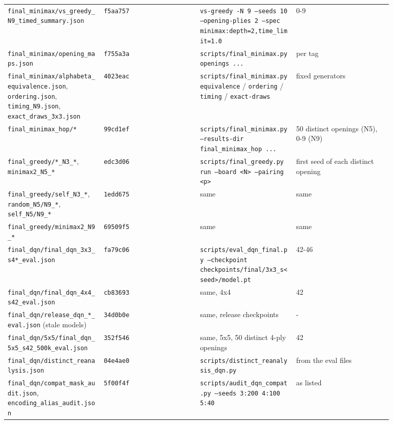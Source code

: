 \documentclass[11pt]{article}
\begin{document}
\begin{center}
\begin{longtable}{p{0.22\linewidth}p{0.22\linewidth}p{0.22\linewidth}p{0.22\linewidth}}
\texttt{final\_minimax/vs\_greedy\_N9\_timed\_summary.json} & \texttt{f5aa757} & \texttt{vs-greedy -N 9 --seeds 10 --opening-plies 2 --spec minimax:depth=2,time\_limit=1.0} & 0-9 \\
\texttt{final\_minimax/opening\_maps.json} & \texttt{f755a3a} & \texttt{scripts/final\_minimax.py openings ...} & per tag \\
\texttt{final\_minimax/alphabeta\_equivalence.json}, \texttt{ordering.json}, \texttt{timing\_N9.json}, \texttt{exact\_draws\_3x3.json} & \texttt{4023eac} & \texttt{scripts/final\_minimax.py equivalence} / \texttt{ordering} / \texttt{timing} / \texttt{exact-draws} & fixed generators \\
\texttt{final\_minimax\_hop/*} & \texttt{99cd1ef} & \texttt{scripts/final\_minimax.py --results-dir final\_minimax\_hop ...} & 50 distinct openings (N5), 0-9 (N9) \\
\texttt{final\_greedy/*\_N3\_*}, \texttt{minimax2\_N5\_*} & \texttt{edc3d06} & \texttt{scripts/final\_greedy.py run --board <N> --pairing <p>} & first seed of each distinct opening \\
\texttt{final\_greedy/self\_N3\_*}, \texttt{random\_N5/N9\_*}, \texttt{self\_N5/N9\_*} & \texttt{1edd675} & same & same \\
\texttt{final\_greedy/minimax2\_N9\_*} & \texttt{69509f5} & same & same \\
\texttt{final\_dqn/final\_dqn\_3x3\_s4*\_eval.json} & \texttt{fa79c06} & \texttt{scripts/eval\_dqn\_final.py --checkpoint checkpoints/final/3x3\_s<seed>/model.pt} & 42-46 \\
\texttt{final\_dqn/final\_dqn\_4x4\_s42\_eval.json} & \texttt{cb83693} & same, 4x4 & 42 \\
\texttt{final\_dqn/release\_dqn\_*\_eval.json} (stale models) & \texttt{34d0b0e} & same, release checkpoints & - \\
\texttt{final\_dqn/5x5/final\_dqn\_5x5\_s42\_500k\_eval.json} & \texttt{352f546} & same, 5x5, 50 distinct 4-ply openings & 42 \\
\texttt{final\_dqn/distinct\_reanalysis.json} & \texttt{04e4ae0} & \texttt{scripts/distinct\_reanalysis\_dqn.py} & from the eval files \\
\texttt{final\_dqn/compat\_mask\_audit.json}, \texttt{encoding\_alias\_audit.json} & \texttt{5f00f4f} & \texttt{scripts/audit\_dqn\_compat.py --seeds 3:200 4:100 5:40} & as listed \\
\bottomrule
\end{longtable}
\end{center}
\end{document}
